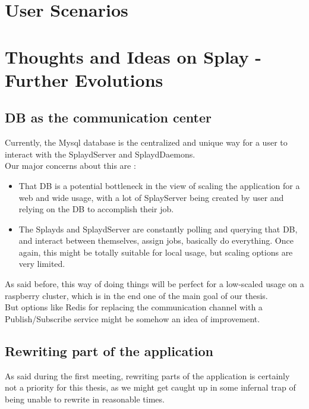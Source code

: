 \documentclass{article}
\begin{document}
\section{User Scenarios}

\section{Thoughts and Ideas on Splay - Further Evolutions}

  \subsection{DB as the communication center}

    Currently, the Mysql database is the centralized and unique way for
    a user to interact with the SplaydServer and SplaydDaemons.\\

    Our major concerns about this are : \\
    \begin{itemize}
      \item That DB is a potential bottleneck in the view of scaling the
      application for a web and wide usage, with a lot of SplayServer being
      created by user and relying on the DB to accomplish their job.
      \item The Splayds and SplaydServer are constantly polling and
      querying that DB, and interact between themselves, assign jobs, basically
      do everything. Once again, this might be totally suitable for local usage,
      but scaling options are very limited.
    \end{itemize}

    As said before, this way of doing things will be perfect for a low-scaled
    usage on a raspberry cluster, which is in the end one of the main goal
    of our thesis.\\
    But options like Redis \cite{redispubsub} for replacing the communication channel with a
    Publish/Subscribe service might be somehow an idea of improvement.

  \subsection{Rewriting part of the application}

    As said during the first meeting, rewriting parts of the application
    is certainly not a priority for this thesis, as we might get caught up in
    some infernal trap of being unable to rewrite in reasonable times.\\
\end{document}
